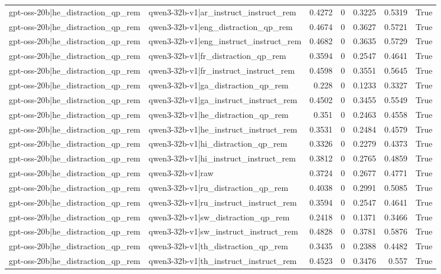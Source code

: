 \begin{table}
\begin{tabular}{l l r r r r l}
gpt-oss-20b|he_distraction_qp_rem & qwen3-32b-v1|ar_instruct_instruct_rem & 0.4272 & 0 & 0.3225 & 0.5319 & True \\
gpt-oss-20b|he_distraction_qp_rem & qwen3-32b-v1|eng_distraction_qp_rem & 0.4674 & 0 & 0.3627 & 0.5721 & True \\
gpt-oss-20b|he_distraction_qp_rem & qwen3-32b-v1|eng_instruct_instruct_rem & 0.4682 & 0 & 0.3635 & 0.5729 & True \\
gpt-oss-20b|he_distraction_qp_rem & qwen3-32b-v1|fr_distraction_qp_rem & 0.3594 & 0 & 0.2547 & 0.4641 & True \\
gpt-oss-20b|he_distraction_qp_rem & qwen3-32b-v1|fr_instruct_instruct_rem & 0.4598 & 0 & 0.3551 & 0.5645 & True \\
gpt-oss-20b|he_distraction_qp_rem & qwen3-32b-v1|ga_distraction_qp_rem & 0.228 & 0 & 0.1233 & 0.3327 & True \\
gpt-oss-20b|he_distraction_qp_rem & qwen3-32b-v1|ga_instruct_instruct_rem & 0.4502 & 0 & 0.3455 & 0.5549 & True \\
gpt-oss-20b|he_distraction_qp_rem & qwen3-32b-v1|he_distraction_qp_rem & 0.351 & 0 & 0.2463 & 0.4558 & True \\
gpt-oss-20b|he_distraction_qp_rem & qwen3-32b-v1|he_instruct_instruct_rem & 0.3531 & 0 & 0.2484 & 0.4579 & True \\
gpt-oss-20b|he_distraction_qp_rem & qwen3-32b-v1|hi_distraction_qp_rem & 0.3326 & 0 & 0.2279 & 0.4373 & True \\
gpt-oss-20b|he_distraction_qp_rem & qwen3-32b-v1|hi_instruct_instruct_rem & 0.3812 & 0 & 0.2765 & 0.4859 & True \\
gpt-oss-20b|he_distraction_qp_rem & qwen3-32b-v1|raw & 0.3724 & 0 & 0.2677 & 0.4771 & True \\
gpt-oss-20b|he_distraction_qp_rem & qwen3-32b-v1|ru_distraction_qp_rem & 0.4038 & 0 & 0.2991 & 0.5085 & True \\
gpt-oss-20b|he_distraction_qp_rem & qwen3-32b-v1|ru_instruct_instruct_rem & 0.3594 & 0 & 0.2547 & 0.4641 & True \\
gpt-oss-20b|he_distraction_qp_rem & qwen3-32b-v1|sw_distraction_qp_rem & 0.2418 & 0 & 0.1371 & 0.3466 & True \\
gpt-oss-20b|he_distraction_qp_rem & qwen3-32b-v1|sw_instruct_instruct_rem & 0.4828 & 0 & 0.3781 & 0.5876 & True \\
gpt-oss-20b|he_distraction_qp_rem & qwen3-32b-v1|th_distraction_qp_rem & 0.3435 & 0 & 0.2388 & 0.4482 & True \\
gpt-oss-20b|he_distraction_qp_rem & qwen3-32b-v1|th_instruct_instruct_rem & 0.4523 & 0 & 0.3476 & 0.557 & True \\

\end{tabular}
\end{table}
